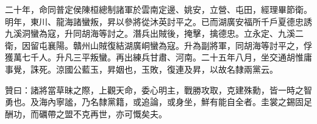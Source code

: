 \begin{pinyinscope}
二十年，命同普定侯陳桓總制諸軍於雲南定邊、姚安，立營、屯田，經理畢節衛。明年，東川、龍海諸蠻叛，昇以參將從沐英討平之。已而湖廣安福所千戶夏德忠誘九溪洞蠻為寇，升同胡海等討之。潛兵出賊後，掩擊，擒德忠。立永定、九溪二衛，因留屯襄陽。贛州山賊復結湖廣峒蠻為寇。升為副將軍，同胡海等討平之，俘獲萬七千人。升凡三平叛蠻。再出練兵甘肅、河南。二十五年八月，坐交通胡惟庸事覺，誅死。涼國公藍玉，昇姻也，玉敗，復連及昇，以故名隸兩黨云。

贊曰：諸將當草昧之際，上觀天命，委心明主，戰勝攻取，克建殊勳，皆一時之智勇也。及海內寧謐，乃名隸黨籍，或追論，或身坐，鮮有能自全者。圭裳之錫固足酬功，而礪帶之盟不克再世，亦可慨矣夫。


\end{pinyinscope}